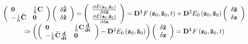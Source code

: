 \documentclass{amsart}
\begin{document}
\[
\begin{array}{c}
 \left( {{\begin{array}{*{20}c}
 {\rm {\bf 0}} \hfill & {\tfrac{i}{\hbar }{\rm {\bf C}}} \hfill \\
 {-\tfrac{i}{\hbar }{\rm {\bf \bar {C}}}} \hfill & {\rm {\bf 0}} \hfill \\
\end{array} }} \right)\left( {{\begin{array}{*{20}c}
 {\delta {\rm {\bf \dot {\bar {z}}}}} \hfill \\
 {\delta {\rm {\bf \dot {z}}}} \hfill \\
\end{array} }} \right)=\left( {{\begin{array}{*{20}c}
 {\frac{\partial \tilde {E}\left( {{\rm {\bf z}}_0 ,{\rm {\bf \bar {z}}}_0 }
\right)}{\partial \delta {\rm {\bf \bar {z}}}}} \hfill \\
 {\frac{\partial \tilde {E}\left( {{\rm {\bf z}}_0 ,{\rm {\bf \bar {z}}}_0 }
\right)}{\partial \delta {\rm {\bf z}}}} \hfill \\
\end{array} }} \right)={\rm {\bf D}}^{\rm {\bf 1}}F\left( {{\rm {\bf z}}_0
,{\rm {\bf \bar {z}}}_0 ,t} \right)+{\rm {\bf D}}^2E_0 \left( {{\rm {\bf
z}}_0 ,{\rm {\bf \bar {z}}}_0 } \right)\left( {{\begin{array}{*{20}c}
 {\delta {\rm {\bf \bar {z}}}} \hfill \\
 {\delta {\rm {\bf z}}} \hfill \\
\end{array} }} \right) \\
 \Rightarrow \left( {\left( {{\begin{array}{*{20}c}
 {\rm {\bf 0}} \hfill & {\tfrac{i}{\hbar }{\rm {\bf C}}\frac{{\rm {\bf
d}}}{{\rm {\bf dt}}}} \hfill \\
 {-\tfrac{i}{\hbar }{\rm {\bf \bar {C}}}\frac{{\rm {\bf d}}}{{\rm {\bf
dt}}}} \hfill & {\rm {\bf 0}} \hfill \\
\end{array} }} \right)-{\rm {\bf D}}^2E_0 \left( {{\rm {\bf z}}_0 ,{\rm {\bf
\bar {z}}}_0 } \right)} \right)\left( {{\begin{array}{*{20}c}
 {\delta {\rm {\bf \bar {z}}}} \hfill \\
 {\delta {\rm {\bf z}}} \hfill \\
\end{array} }} \right)={\rm {\bf D}}^{\rm {\bf 1}}F\left( {{\rm {\bf z}}_0
,{\rm {\bf \bar {z}}}_0 ,t} \right) \\

\end{array}\]
\end{document}
